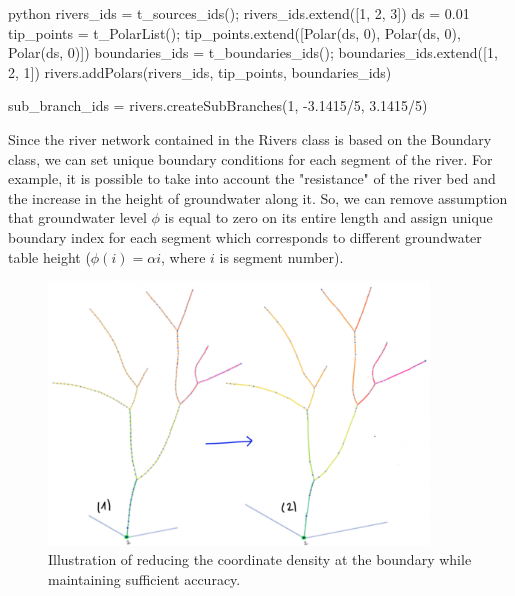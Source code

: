 \documentclass[]{pracamgr}
\begin{document}
      \begin{mintedbox}{python}
        rivers_ids = t_sources_ids(); rivers_ids.extend([1, 2, 3])
        ds = 0.01
        tip_points = t_PolarList(); tip_points.extend([Polar(ds, 0), Polar(ds, 0), Polar(ds, 0)])
        boundaries_ids = t_boundaries_ids(); boundaries_ids.extend([1, 2, 1])
        rivers.addPolars(rivers_ids, tip_points, boundaries_ids)
      
        sub_branch_ids = rivers.createSubBranches(1, -3.1415/5, 3.1415/5)\end{mintedbox}

      Since the river network contained in the Rivers class is based on the Boundary class, we can set unique boundary conditions for each segment of the river. For example, it is possible to take into account the "resistance" of the river bed and the increase in the height of groundwater along it. So, we can remove assumption that groundwater level $\phi$ is equal to zero on its entire length and assign unique boundary index for each segment which corresponds to different groundwater table height ($\phi(i) = \alpha i$, where $i$ is segment number).

      \begin{figure}[H]
        \centering
        \includegraphics[width=0.9\textwidth]{figs/tree_coarsening.png}        
        \caption{Illustration of reducing the coordinate density at the boundary while maintaining sufficient accuracy.}
        \label{tree_coarsening}
      \end{figure}
\end{document}
